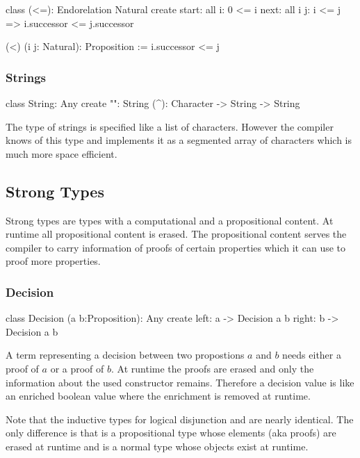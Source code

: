 \begin{alba}
  class
    (<=): Endorelation Natural
  create
    start: all i: 0 <= i
    next:  all i j: i <= j => i.successor <= j.successor

  (<) (i j: Natural): Proposition := i.successor <= j
\end{alba}
\vskip 2mm


\subsubsection{Strings}

\begin{alba}
  class
    String: Any
  create
    "": String
    (^): Character -> String -> String
\end{alba}

The type of strings is specified like a list of characters. However the
compiler knows of this type and implements it as a segmented array of
characters which is much more space efficient.
\newline




\subsection{Strong Types}
\label{sec:prelude-strong-types}

Strong types are types with a computational and a propositional content. At
runtime all propositional content is erased. The propositional content serves
the compiler to carry information of proofs of certain properties which it can
use to proof more properties.


\subsubsection{Decision}
%
\begin{alba}
  class
    Decision (a b:Proposition): Any
  create
    left:  a -> Decision a b
    right: b -> Decision a b
\end{alba}

A term representing a decision between two propostions $a$ and $b$ needs
either a proof of $a$ or a proof of $b$. At runtime the proofs are erased and
only the information about the used constructor remains. Therefore a decision
value is like an enriched boolean value where the enrichment is removed at
runtime.

Note that the inductive types  for logical disjunction and
 are nearly identical. The only difference is that  is
a propositional type whose elements (aka proofs) are erased at runtime and
 is a normal type whose objects exist at runtime.
\newline




